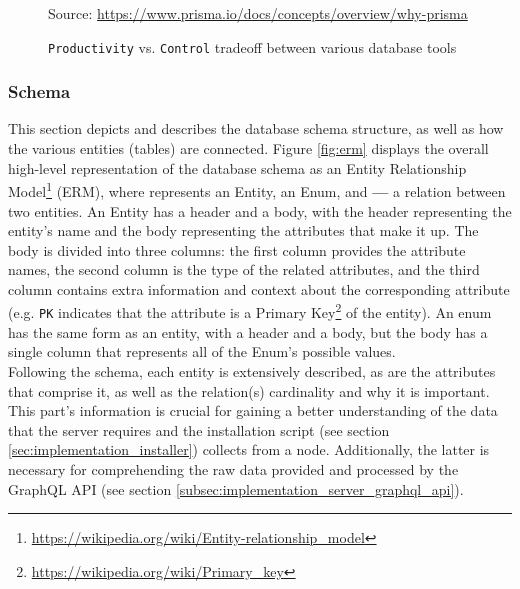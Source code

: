 \begin{figure}[htbp]
  \centering
  \def\stackalignment{r} %
  {\scriptsize Source: \url{https://www.prisma.io/docs/concepts/overview/why-prisma} }
  \caption{\texttt{Productivity}
  vs.
  \texttt{Control}
  tradeoff
  between
  various
  database
  tools}
  \label{fig:orm_productivity_control}
\end{figure}

\subsubsection{Schema}
\label{subsubsec:implementation_server_database_schema}

This section depicts and describes the database schema structure, as well as how
the various entities (tables) are connected. Figure \ref{fig:erm} displays the overall
high-level representation of the database schema as an Entity Relationship Model\footnote{\url{https://wikipedia.org/wiki/Entity-relationship_model}}
(ERM), where 
represents an Entity, 
an Enum, and \textbf{---} a relation between two entities. An Entity has a
header and a body, with the header representing the entity's name and the body representing
the attributes that make it up. The body is divided into three columns: the first
column provides the attribute names, the second column is the type of the
related attributes, and the third column contains extra information and context about
the corresponding attribute (e.g. \texttt{PK} indicates that the attribute is a
Primary Key\footnote{\url{https://wikipedia.org/wiki/Primary_key}} of the entity).
An enum has the same form as an entity, with a header and a body, but the body
has a single column that represents all of the Enum's possible values. \\ %
Following the schema, each entity is extensively described, as are the
attributes that comprise it, as well as the relation(s) cardinality and why it
is important. \\ %
This part's information is crucial for gaining a better understanding of the
data that the server requires and the installation script (see section \ref{sec:implementation_installer})
collects from a node. Additionally, the latter is necessary for comprehending
the raw data provided and processed by the GraphQL API (see section \ref{subsec:implementation_server_graphql_api}).

